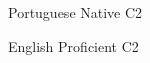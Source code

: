 


\begin{cvhonors}

  \cvhonor
    {Portuguese}
    {}
    {Native}
    {C2}

  \cvhonor
    {English}
    {}
    {Proficient}
    {C2}


\end{cvhonors}

